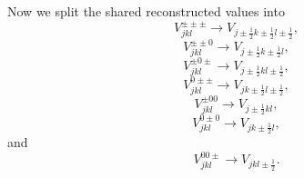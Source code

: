 \documentclass{aastex63}
\begin{document}
Now we split the shared reconstructed values into
\begin{equation}
V^{\pm \pm \pm}_{j k l} \rightarrow V_{j\pm\tfrac{1}{2} k\pm\tfrac{1}{2} l\pm\tfrac{1}{2}},
\end{equation}
\begin{equation}
V^{\pm \pm 0}_{j k l} \rightarrow V_{j\pm\tfrac{1}{2} k\pm\tfrac{1}{2} l},
\end{equation}
\begin{equation}
V^{\pm 0 \pm}_{j k l} \rightarrow V_{j\pm\tfrac{1}{2} k l\pm\tfrac{1}{2}},
\end{equation}
\begin{equation}
V^{0 \pm \pm}_{j k l} \rightarrow V_{j k\pm\tfrac{1}{2} l\pm\tfrac{1}{2}},
\end{equation}
\begin{equation}
V^{\pm 0 0}_{j k l} \rightarrow V_{j\pm\tfrac{1}{2} k l},
\end{equation}
\begin{equation}
V^{0 \pm 0}_{j k l} \rightarrow V_{j k\pm\tfrac{1}{2} l},
\end{equation}
and
\begin{equation}
V^{0 0 \pm}_{j k l} \rightarrow V_{j k l\pm\tfrac{1}{2}}.
\end{equation}






\end{document}
